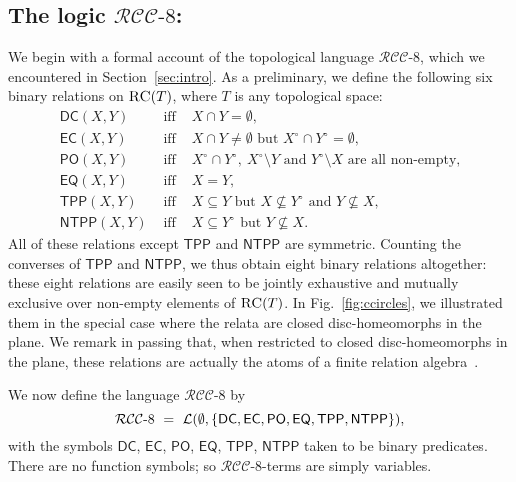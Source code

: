 \documentclass{LMCS}
\theoremstyle{plain}
\newcommand{\RCCE}{\ensuremath{\mathcal{RCC}\text{-}8}}\newcommand{\RCCEcc}{\ensuremath{\RCCE{}cc}}\newcommand{\RCCEc}{\ensuremath{\RCCE{}c}}
\newcommand{\ti}[2][]{#2^{\circ_{#1}}}
\begin{document}
\subsection*{The logic $\RCCE$:}
We begin with a formal account of the topological language $\RCCE$,
which we encountered in Section~\ref{sec:intro}.  As a preliminary, we
define the following six binary relations on $\textsc{RC}(T)$, where $T$ is
any topological space:
\begin{equation}
\begin{array}{rcl}
\mathsf{DC}(X, Y)  &\mbox{ iff }  &X \cap Y = \emptyset,\\
\mathsf{EC}(X,Y)  &\mbox{ iff }  &X \cap Y \neq \emptyset \text{\ \  but }
        \ti{X} \cap \ti{Y} = \emptyset,\\
\mathsf{PO}(X,Y) &\mbox{ iff } &\ti{X} \cap \ti{Y}, \ \ti{X} \setminus Y \mbox{ and } \ti{Y} \setminus X \text{ are all non-empty,}\\
\mathsf{EQ}(X,Y)  &\mbox{ iff }  &X = Y,\\
\mathsf{TPP}(X,Y)  &\mbox{ iff }  &X \subseteq Y  \text{ but }
       X \not \subseteq \ti{Y} \text{ and } Y \not\subseteq X,\\
\mathsf{NTPP}(X,Y)  &\mbox{ iff }  &X \subseteq \ti{Y}  \text{ but } Y \not\subseteq X.
\end{array}
\label{eq:rcc8}
\end{equation}
All of these relations except $\mathsf{TPP}$ and $\mathsf{NTPP}$ are
symmetric.  Counting the converses of $\mathsf{TPP}$ and
$\mathsf{NTPP}$, we thus obtain eight binary relations altogether:
these eight relations are easily seen to be jointly exhaustive and
mutually exclusive over non-empty elements of $\textsc{RC}(T)$.  In
Fig.~\ref{fig:ccircles}, we illustrated them in the special
case where the relata are closed disc-homeomorphs in the plane. We
remark in passing that, when restricted to closed disc-homeomorphs in
the plane, these relations are actually the atoms of a finite relation
algebra~\cite{D+O00,Li-Ying03b}.

We now define the language $\RCCE$ by
\begin{equation*}
\RCCE ~=~ \cL(\emptyset,
\{\mathsf{DC}, \mathsf{EC}, \mathsf{PO}, \mathsf{EQ}, \mathsf{TPP}, \mathsf{NTPP}\}),
\end{equation*}
with the symbols $\mathsf{DC}$, $\mathsf{EC}$, $\mathsf{PO}$,
$\mathsf{EQ}$, $\mathsf{TPP}$, $\mathsf{NTPP}$ taken to be binary
predicates. There
are no function symbols; so $\RCCE$-terms are simply variables.
\end{document}
